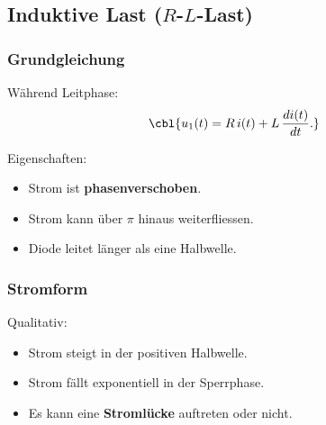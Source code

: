 \begin{center}
\end{center}

\subsection{Induktive Last ($R$-$L$-Last)}

\subsubsection{Grundgleichung}

Während Leitphase:
\[
\cbl{u_1(t) = R\,i(t) + L\,\frac{di(t)}{dt}.}
\]

Eigenschaften:
\begin{itemize}
    \item Strom ist \textbf{phasenverschoben}.
    \item Strom kann über $\pi$ hinaus weiterfliessen.
    \item Diode leitet länger als eine Halbwelle.
\end{itemize}


\subsubsection{Stromform}

Qualitativ:
\begin{itemize}
    \item Strom steigt in der positiven Halbwelle.
    \item Strom fällt exponentiell in der Sperrphase.
    \item Es kann eine \textbf{Stromlücke} auftreten oder nicht.
\end{itemize}

